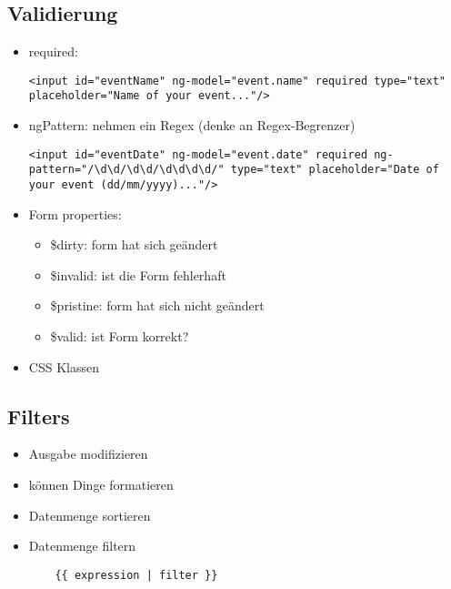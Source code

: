 \subsection{Validierung}
\begin{itemize}
  \item required:
    \begin{verbatim}
<input id="eventName" ng-model="event.name" required type="text" placeholder="Name of your event..."/>
    \end{verbatim}
  \item ngPattern: nehmen ein Regex (denke an Regex-Begrenzer)
    \begin{verbatim}
<input id="eventDate" ng-model="event.date" required ng-pattern="/\d\d/\d\d/\d\d\d\d/" type="text" placeholder="Date of your event (dd/mm/yyyy)..."/>
    \end{verbatim}
  \item Form properties:
    \begin{itemize}
      \item \$dirty: form hat sich geändert
      \item \$invalid: ist die Form fehlerhaft
      \item \$pristine: form hat sich nicht geändert
      \item \$valid: ist Form korrekt?
    \end{itemize}
  \item CSS Klassen
\end{itemize}

\subsection{Filters}
\begin{itemize}
  \item Ausgabe modifizieren
  \item können Dinge formatieren
  \item Datenmenge sortieren
  \item Datenmenge filtern
    \begin{verbatim}
    {{ expression | filter }}
    \end{verbatim}
\end{itemize}



